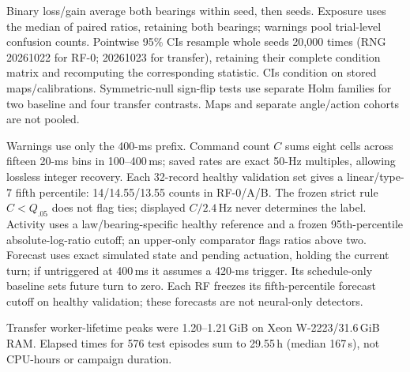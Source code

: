Binary loss/gain average both bearings within seed, then seeds. Exposure uses the median of paired ratios, retaining both bearings; warnings pool trial-level confusion counts. Pointwise 95\% CIs resample whole seeds 20,000 times (RNG 20261022 for RF-0; 20261023 for transfer), retaining their complete condition matrix and recomputing the corresponding statistic. CIs condition on stored maps/calibrations. Symmetric-null sign-flip tests use separate Holm families for two baseline and four transfer contrasts. Maps and separate angle/action cohorts are not pooled.

Warnings use only the 400-ms prefix. Command count $C$ sums eight cells across fifteen 20-ms bins in 100--400\,ms; saved rates are exact 50-Hz multiples, allowing lossless integer recovery. Each 32-record healthy validation set gives a linear/type-7 fifth percentile: 14/14.55/13.55 counts in RF-0/A/B. The frozen strict rule $C<Q_{.05}$ does not flag ties; displayed $C/2.4$\,Hz never determines the label. Activity uses a law/bearing-specific healthy reference and a frozen 95th-percentile absolute-log-ratio cutoff; an upper-only comparator flags ratios above two. Forecast uses exact simulated state and pending actuation, holding the current turn; if untriggered at 400\,ms it assumes a 420-ms trigger. Its schedule-only baseline sets future turn to zero. Each RF freezes its fifth-percentile forecast cutoff on healthy validation; these forecasts are not neural-only detectors.

Transfer worker-lifetime peaks were 1.20--1.21\,GiB on Xeon W-2223/31.6\,GiB RAM. Elapsed times for 576 test episodes sum to 29.55\,h (median 167\,s), not CPU-hours or campaign duration.
